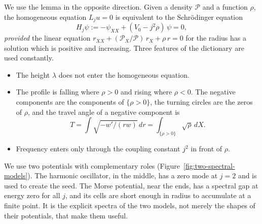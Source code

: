 We use the lemma in the opposite direction. Given a density
$\mathcal P$ and a function $\rho$, the homogeneous equation
$L_ju=0$ is equivalent to the Schr\"odinger equation
\[
 H_j\psi:=-\psi_{XX}+(V_0-j^2\rho)\,\psi=0 ,
\]
\emph{provided} the linear equation
$r_{XX}+(\mathcal P_X/\mathcal P)\,r_X+\rho\,r=0$ for the radius has a
solution which is positive and increasing. Three features of the
dictionary are used constantly.
\begin{itemize}
\item The height $\lambda$ does not enter the homogeneous equation.
\item The profile is falling where $\rho>0$ and rising where $\rho<0$.
 The negative components are the components of $\{\rho>0\}$, the
 turning circles are the zeros of $\rho$, and the travel angle of a
 negative component is
 \begin{equation}\label{eq:travel-angle-model}
  T=\int\sqrt{-w'/(rw)}\,dr=\int_{\{\rho>0\}}\sqrt\rho\,dX .
 \end{equation}
\item Frequency enters only through the coupling constant $j^2$ in
 front of $\rho$.
\end{itemize}

We use two potentials with complementary roles
(Figure~\ref{fig:two-spectral-models}). The harmonic oscillator, in
the middle, has a zero mode at $j=2$ and is used to create the seed.
The Morse potential, near the ends, has a spectral gap at energy zero
for all $j$, and its cells are short enough in radius to accumulate at
a finite point. It is the explicit spectra of the two models, not
merely the shapes of their potentials, that make them useful.

